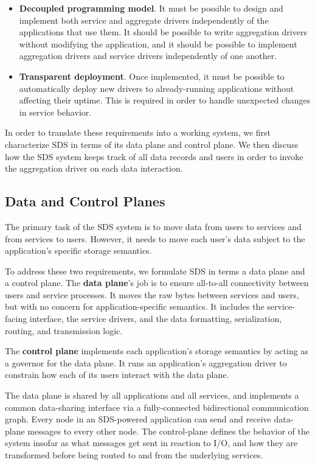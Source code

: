 \begin{itemize}
   \item \textbf{Decoupled programming model}.  It must be possible to design
      and implement both service and aggregate drivers independently of the
      applications that use them.  It should be possible to write
      aggregation drivers without modifying the application, and it should be
      possible to implement aggregation drivers and service drivers
      independently of one another.
   \item \textbf{Transparent deployment}.  Once implemented, it must be possible
      to automatically deploy new drivers to already-running applications
      without affecting their uptime.  This is required in order to handle
      unexpected changes in service behavior.
\end{itemize}

In order to translate these requirements into a working system, we first
characterize SDS in terms of its data plane and control plane.  We then discuss
how the SDS system keeps track of all data records and users in order to invoke
the aggregation driver on each data interaction.

\subsection{Data and Control Planes}

The primary task of the SDS system is to move data from users to services and from
services to users.  However, it needs to move each user's data
subject to the application's specific storage semantics.

To address these two requirements, we formulate SDS in terms a
data plane and a control plane.  The \textbf{data plane}'s job
is to ensure all-to-all connectivity between users and service processes.
It moves the raw bytes between services and users, but with no concern for
application-specific semantics.  It includes the service-facing interface, the
service drivers, and the data formatting, serialization, routing, and transmission
logic.

The \textbf{control plane} implements each application's
storage semantics by acting as a governor for the data plane.
It runs an application's aggregation driver 
to constrain how each of its users interact with the data plane.

The data plane is shared by all applications and all services, and implements a
common data-sharing interface via a fully-connected bidirectional communication graph.
Every node in an SDS-powered application can send and receive data-plane
messages to every other node.  The control-plane defines the behavior of the
system insofar as what messages get sent in reaction to I/O, and how they are
transformed before being routed to and from the underlying services.

